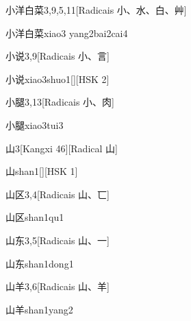 \begin{entry}{小洋白菜}{3,9,5,11}[Radicais ⼩、⽔、⽩、⾋]
  \begin{phonetics}{小洋白菜}{xiao3 yang2bai2cai4}
  \end{phonetics}
\end{entry}

\begin{entry}{小说}{3,9}[Radicais ⼩、⾔]
  \begin{phonetics}{小说}{xiao3shuo1}[][HSK 2]
  \end{phonetics}
\end{entry}

\begin{entry}{小腿}{3,13}[Radicais ⼩、⾁]
  \begin{phonetics}{小腿}{xiao3tui3}
  \end{phonetics}
\end{entry}

\begin{entry}{山}{3}[Kangxi 46][Radical ⼭]
  \begin{phonetics}{山}{shan1}[][HSK 1]
  \end{phonetics}
\end{entry}

\begin{entry}{山区}{3,4}[Radicais ⼭、⼖]
  \begin{phonetics}{山区}{shan1qu1}
  \end{phonetics}
\end{entry}

\begin{entry}{山东}{3,5}[Radicais ⼭、⼀]
  \begin{phonetics}{山东}{shan1dong1}
  \end{phonetics}
\end{entry}

\begin{entry}{山羊}{3,6}[Radicais ⼭、⽺]
  \begin{phonetics}{山羊}{shan1yang2}
  \end{phonetics}
\end{entry}

